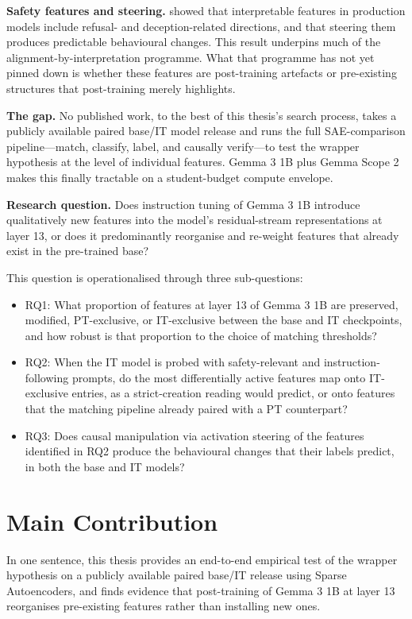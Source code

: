 \textbf{Safety features and steering.} \textcite{templeton_scaling_2024} showed that interpretable features in production models include refusal- and deception-related directions, and that steering them produces predictable behavioural changes. This result underpins much of the alignment-by-interpretation programme. What that programme has not yet pinned down is whether these features are post-training artefacts or pre-existing structures that post-training merely highlights.

\textbf{The gap.} No published work, to the best of this thesis's search process, takes a publicly available paired base/IT model release and runs the full SAE-comparison pipeline---match, classify, label, and causally verify---to test the wrapper hypothesis at the level of individual features. Gemma 3 1B plus Gemma Scope 2 makes this finally tractable on a student-budget compute envelope.

\textbf{Research question.} Does instruction tuning of Gemma 3 1B introduce qualitatively new features into the model's residual-stream representations at layer 13, or does it predominantly reorganise and re-weight features that already exist in the pre-trained base?

This question is operationalised through three sub-questions:
\begin{itemize}
    \item RQ1: What proportion of features at layer 13 of Gemma 3 1B are preserved, modified, PT-exclusive, or IT-exclusive between the base and IT checkpoints, and how robust is that proportion to the choice of matching thresholds?
    \item RQ2: When the IT model is probed with safety-relevant and instruction-following prompts, do the most differentially active features map onto IT-exclusive entries, as a strict-creation reading would predict, or onto features that the matching pipeline already paired with a PT counterpart?
    \item RQ3: Does causal manipulation via activation steering of the features identified in RQ2 produce the behavioural changes that their labels predict, in both the base and IT models?
\end{itemize}

\section{Main Contribution}
\label{sec:main-contribution}

In one sentence, this thesis provides an end-to-end empirical test of the wrapper hypothesis on a publicly available paired base/IT release using Sparse Autoencoders, and finds evidence that post-training of Gemma 3 1B at layer 13 reorganises pre-existing features rather than installing new ones.

